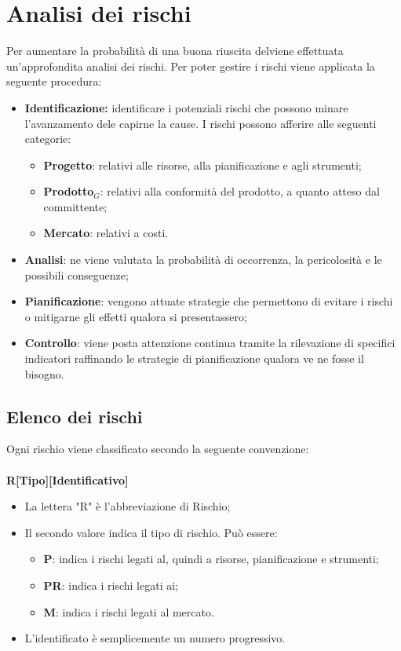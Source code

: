 \chapter{Analisi dei rischi}
\label{rischi}
Per aumentare la probabilità di una buona riuscita delviene effettuata un'approfondita analisi dei rischi. Per poter gestire i rischi viene applicata la seguente procedura:
\begin{itemize}
	\item \textbf{Identificazione:} identificare i potenziali rischi che possono minare l'avanzamento dele capirne la cause. I rischi possono afferire alle seguenti categorie:
	\begin{itemize}
		\item \textbf{Progetto}: relativi alle risorse, alla pianificazione e agli strumenti;
		\item \textbf{Prodotto$_{G}$}: relativi alla conformità del prodotto, a quanto atteso dal committente;
		\item \textbf{Mercato}: relativi a costi.
	\end{itemize}
	\item \textbf{Analisi}: ne viene valutata la probabilità di occorrenza, la pericolosità e le possibili conseguenze;
	\item \textbf{Pianificazione}: vengono attuate strategie che permettono di evitare i rischi o mitigarne gli effetti qualora si presentassero;
	\item \textbf{Controllo}: viene posta attenzione continua tramite la rilevazione di specifici indicatori raffinando le strategie di pianificazione qualora ve ne fosse il bisogno.
\end{itemize}
\section{Elenco dei rischi}
Ogni rischio viene classificato secondo la seguente convenzione:\\\\
\centering \textbf{R[Tipo][Identificativo]}\\
\begin{itemize}
	\item La lettera "R" è l'abbreviazione di Rischio;
	\item Il secondo valore indica il tipo di rischio. Può essere:
	\begin{itemize}
		\item \textbf{P}: indica i rischi legati al, quindi a risorse, pianificazione e strumenti;
		\item \textbf{PR}: indica i rischi legati ai;
		\item \textbf{M}: indica i rischi legati al mercato.
	\end{itemize}
	\item L'identificato è semplicemente un numero progressivo.
\end{itemize}

